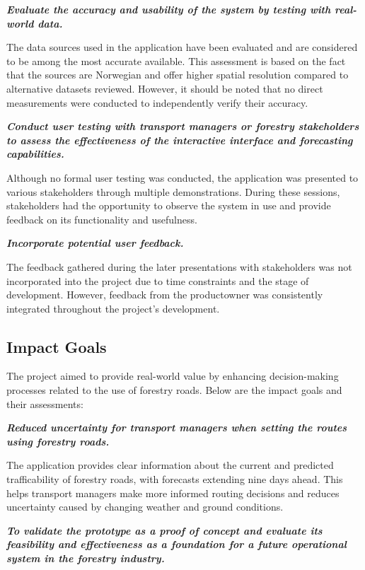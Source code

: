\textbf{\textit{Evaluate the accuracy and usability of the system by testing with real-world data.}}

The data sources used in the application have been evaluated and are considered to be among the most accurate available. This assessment is based on the fact that the sources are Norwegian and offer higher spatial resolution compared to alternative datasets reviewed. However, it should be noted that no direct measurements were conducted to independently verify their accuracy.

\textbf{\textit{Conduct user testing with transport managers or forestry stakeholders to assess the effectiveness of the interactive interface and forecasting capabilities.}}

Although no formal user testing was conducted, the application was presented to various stakeholders through multiple demonstrations. During these sessions, stakeholders had the opportunity to observe the system in use and provide feedback on its functionality and usefulness.

\textbf{\textit{Incorporate potential user feedback.}}

The feedback gathered during the later presentations with stakeholders was not incorporated into the project due to time constraints and the stage of development. However, feedback from the \gls{productowner} was consistently integrated throughout the project's development.

\subsection{Impact Goals}

The project aimed to provide real-world value by enhancing decision-making processes related to the use of forestry roads. Below are the impact goals and their assessments:

\textbf{\textit{Reduced uncertainty for transport managers when setting the routes using forestry roads.}}

The application provides clear information about the current and predicted trafficability of forestry roads, with forecasts extending nine days ahead. This helps transport managers make more informed routing decisions and reduces uncertainty caused by changing weather and ground conditions.

\textbf{\textit{To validate the prototype as a proof of concept and evaluate its feasibility and effectiveness as a foundation for a future operational system in the forestry industry.}}

